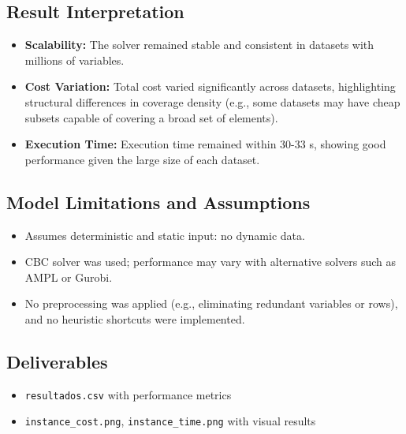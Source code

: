 \documentclass[12pt]{article}
\begin{document}
\subsection{Result Interpretation}

\begin{itemize}
    \item \textbf{Scalability:} The solver remained stable and consistent in datasets with millions of variables.
    \item \textbf{Cost Variation:} Total cost varied significantly across datasets, highlighting structural differences in coverage density (e.g., some datasets may have cheap subsets capable of covering a broad set of elements).
    \item \textbf{Execution Time:} Execution time remained within 30-33 s, showing good performance given the large size of each dataset.
\end{itemize}

\subsection{Model Limitations and Assumptions}

\begin{itemize}
    \item Assumes deterministic and static input: no dynamic data.
    \item CBC solver was used; performance may vary with alternative solvers such as AMPL or Gurobi.
    \item No preprocessing was applied (e.g., eliminating redundant variables or rows), and no heuristic shortcuts were implemented.
\end{itemize}

\subsection{Deliverables}

\begin{itemize}
    \item \texttt{resultados.csv} with performance metrics
    \item \texttt{instance\_cost.png}, \texttt{instance\_time.png} with visual results
\end{itemize}
\end{document}
